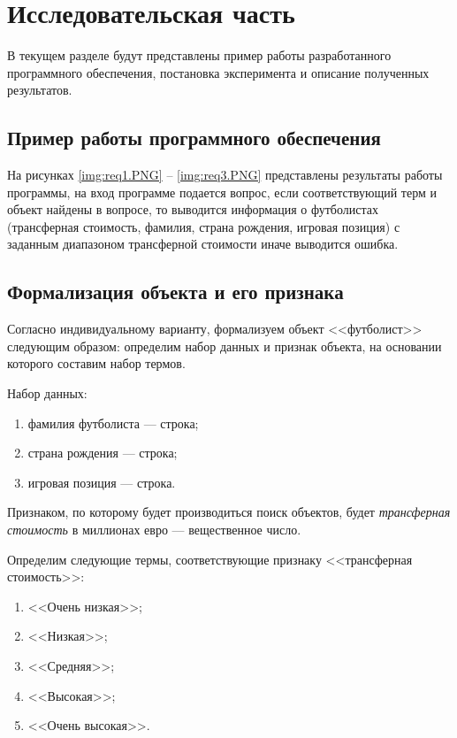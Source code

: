 \chapter{Исследовательская часть}
В текущем разделе будут представлены пример работы разработанного программного обеспечения, постановка эксперимента и описание полученных результатов.

\section{Пример работы программного обеспечения}

На рисунках \ref{img:req1.PNG} -- \ref{img:req3.PNG} представлены результаты работы программы, на вход программе подается вопрос, если соответствующий терм и объект найдены в вопросе, то выводится информация о футболистах (трансферная стоимость, фамилия, страна рождения, игровая позиция) с заданным диапазоном трансферной стоимости иначе выводится ошибка.



\section{Формализация объекта и его признака}
\label{formal}
Согласно индивидуальному варианту, формализуем объект <<футболист>> следующим образом: определим набор данных и признак объекта, на основании которого составим набор термов.

Набор данных:
\begin{enumerate}[label=\arabic*)]
	\item фамилия футболиста --- строка;
	\item страна рождения --- строка;
	\item игровая позиция --- строка.
\end{enumerate}
Признаком, по которому будет производиться поиск объектов, будет \textit{трансферная стоимость} в миллионах евро --- вещественное число.

Определим следующие термы, соответствующие признаку <<трансферная стоимость>>:
\begin{enumerate}[label=\arabic*)]
	\item <<Очень низкая>>;
	\item <<Низкая>>;
	\item <<Средняя>>;
	\item <<Высокая>>;
	\item <<Очень высокая>>.
\end{enumerate}

